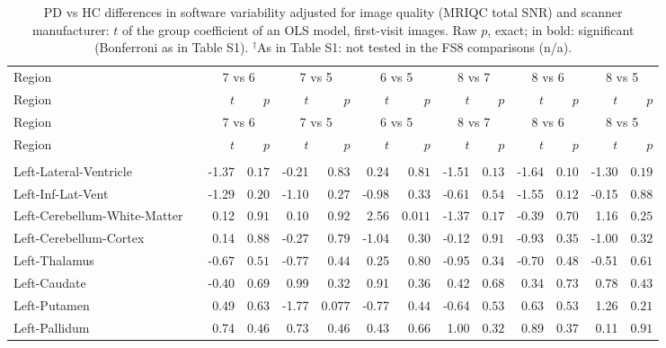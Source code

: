 {\scriptsize\setlength{\tabcolsep}{3pt}
\begin{longtable}{llrrrrrrrrrrrr}
\caption{PD vs HC differences in software variability adjusted for image quality (MRIQC total SNR) and scanner manufacturer: $t$ of the group coefficient of an OLS model, first-visit images. Raw $p$, exact; in bold: significant (Bonferroni as in Table S1). $^{\dagger}$As in Table S1: not tested in the FS8 comparisons (n/a).}\label{tab:S5}\\
\toprule
Region & & \multicolumn{2}{c}{7 vs 6} & \multicolumn{2}{c}{7 vs 5} & \multicolumn{2}{c}{6 vs 5} & \multicolumn{2}{c}{8 vs 7} & \multicolumn{2}{c}{8 vs 6} & \multicolumn{2}{c}{8 vs 5} \\
Region & & $t$ & $p$ & $t$ & $p$ & $t$ & $p$ & $t$ & $p$ & $t$ & $p$ & $t$ & $p$ \\
\midrule\endfirsthead
\toprule
Region & & \multicolumn{2}{c}{7 vs 6} & \multicolumn{2}{c}{7 vs 5} & \multicolumn{2}{c}{6 vs 5} & \multicolumn{2}{c}{8 vs 7} & \multicolumn{2}{c}{8 vs 6} & \multicolumn{2}{c}{8 vs 5} \\
Region & & $t$ & $p$ & $t$ & $p$ & $t$ & $p$ & $t$ & $p$ & $t$ & $p$ & $t$ & $p$ \\
\midrule\endhead
\bottomrule\endfoot
\midrule\multicolumn{14}{l}{\textbf{Volume (subcortical)}} \\
Left-Lateral-Ventricle &  & -1.37 & $0.17$ & -0.21 & $0.83$ & 0.24 & $0.81$ & -1.51 & $0.13$ & -1.64 & $0.10$ & -1.30 & $0.19$ \\
Left-Inf-Lat-Vent &  & -1.29 & $0.20$ & -1.10 & $0.27$ & -0.98 & $0.33$ & -0.61 & $0.54$ & -1.55 & $0.12$ & -0.15 & $0.88$ \\
Left-Cerebellum-White-Matter &  & 0.12 & $0.91$ & 0.10 & $0.92$ & 2.56 & $0.011$ & -1.37 & $0.17$ & -0.39 & $0.70$ & 1.16 & $0.25$ \\
Left-Cerebellum-Cortex &  & 0.14 & $0.88$ & -0.27 & $0.79$ & -1.04 & $0.30$ & -0.12 & $0.91$ & -0.93 & $0.35$ & -1.00 & $0.32$ \\
Left-Thalamus &  & -0.67 & $0.51$ & -0.77 & $0.44$ & 0.25 & $0.80$ & -0.95 & $0.34$ & -0.70 & $0.48$ & -0.51 & $0.61$ \\
Left-Caudate &  & -0.40 & $0.69$ & 0.99 & $0.32$ & 0.91 & $0.36$ & 0.42 & $0.68$ & 0.34 & $0.73$ & 0.78 & $0.43$ \\
Left-Putamen &  & 0.49 & $0.63$ & -1.77 & $0.077$ & -0.77 & $0.44$ & -0.64 & $0.53$ & 0.63 & $0.53$ & 1.26 & $0.21$ \\
Left-Pallidum &  & 0.74 & $0.46$ & 0.73 & $0.46$ & 0.43 & $0.66$ & 1.00 & $0.32$ & 0.89 & $0.37$ & 0.11 & $0.91$ \\

\end{longtable}}
